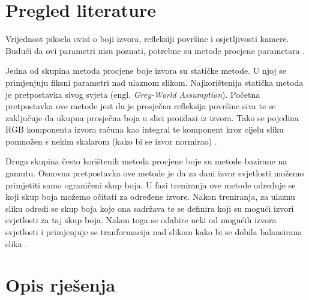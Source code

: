\documentclass[conference]{IEEEtran}
\begin{document}
\section{Pregled literature}
Vrijednost piksela ovisi o boji izvora, refleksiji površine i osjetljivosti kamere.
Budući da ovi parametri nisu poznati, potrebne su metode procjene parametara \cite{article}.

Jedna od skupina metoda procjene boje izvora su statičke metode. U njoj se primjenjuju
fiksni parametri nad ulaznom slikom. Najkorištenija statička metoda je pretpostavka sivog
svjeta (engl. \textit{Grey-World Assumption}). Početna pretpostavka ove metode jest da je
prosječna refleksija površine siva te se zaključuje da ukupna prosječna boja u slici proizlazi
iz izvora. Tako se pojedina RGB komponenta izvora računa kao integral te komponent kroz
cijelu sliku pomnožen s nekim skalarom (kako bi se izvor normirao) \cite{BUCHSBAUM19801}.

Druga skupina često korištenih metoda procjene boje su metode bazirane na gamutu.
Osnovna pretpostavka ove metode je da za dani izvor svjetlosti možemo primjetiti
samo ograničeni skup boja. U fazi treniranja ove metode određuje se koji skup boja
možemo očitati za određene izvore. Nakon treniranja, za ulaznu sliku odredi se skup
boja koje ona sadržava te se definira koji su mogući izvori svjetlosti za taj skup boja.
Nakon toga se odabire neki od mogućih izvora svjetlosti i primjenjuje se tranformacija nad
slikom kako bi se dobila balansirana slika \cite{Forsyth1990}.


\section{Opis rješenja}
\end{document}

